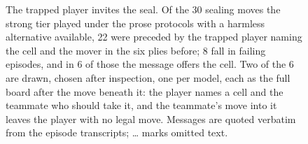 \begin{figure}[tbp]
    \centering
    \caption{The trapped player invites the seal. Of the 30 sealing
    moves the strong tier played under the prose protocols with a harmless
    alternative available, 22 were preceded by the trapped player
    naming the cell and the mover in the six plies before; 8 fall in
    failing episodes, and in 6 of those the message offers the cell.
    Two of the 6 are drawn, chosen after inspection, one per model,
    each as the full board after the move beneath it: the player names a cell
    and the teammate who should take it, and the teammate's move into it
    leaves the player with no legal move. Messages are quoted verbatim from
    the episode transcripts; \ldots{} marks omitted text.}
    \label{fig:invitation-sealed}
\end{figure}

